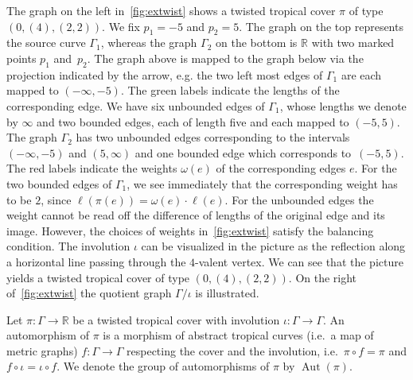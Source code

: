\documentclass[ALCO,published]{cedram}
\DeclareMathOperator{\Aut}{Aut}
\begin{document}
\begin{exam}
The graph on the left in~\cref{fig:extwist} shows a twisted tropical cover $\pi$ of type $(0,(4),(2,2))$. We fix $p_1=-5$ and $p_2=5$. The graph on the top represents the source curve $\Gamma_1$, whereas the graph $\Gamma_2$ on the bottom is $\mathbb{R}$ with two marked points $p_1$ and~$p_2$. The graph above is mapped to the graph below via the projection indicated by the arrow, e.g. the two left most edges of $\Gamma_1$ are each mapped to $(-\infty,-5)$. The green labels indicate the lengths of the corresponding edge. We have six unbounded edges of $\Gamma_1$, whose lengths we denote by $\infty$ and two bounded edges, each of length five and each mapped to $(-5,5)$. The graph $\Gamma_2$ has two unbounded edges corresponding to the intervals $(-\infty,-5)$ and $(5,\infty)$ and one bounded edge which corresponds to~$(-5,5)$. The red labels indicate the weights $\omega(e)$ of the corresponding edges $e$. For the two bounded edges of $\Gamma_1$, we see immediately that the corresponding weight has to be $2$, since $\ell(\pi(e))=\omega(e)\cdot \ell(e)$. For the unbounded edges the weight cannot be read off the difference of lengths of the original edge and its image. However, the choices of weights in~\cref{fig:extwist} satisfy the balancing condition. The involution $\iota$ can be visualized in the picture as the reflection along a horizontal line passing through the $4$-valent vertex. We can see that the picture
yields a twisted tropical cover of type $(0,(4),(2,2))$. On the right of~\cref{fig:extwist} the quotient graph $\Gamma/\iota$ is illustrated.
\end{exam}

\begin{defi}[Automorphisms]
    Let $\pi:\Gamma\rightarrow \mathbb{R}$ be a twisted tropical cover with involution $\iota:\Gamma\rightarrow \Gamma$. An automorphism of $\pi$ is a morphism of abstract tropical curves (i.e.\ a map of metric graphs) $f:\Gamma\rightarrow\Gamma$ respecting the cover and the involution, i.e.\ $\pi\circ f = \pi$ and $f\circ \iota = \iota \circ f$. We denote the group of automorphisms of $\pi$ by $\Aut(\pi)$.
\end{defi}
\end{document}
